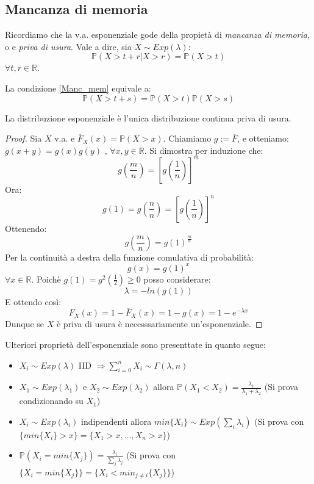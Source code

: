 \subsection{Mancanza di memoria}
Ricordiamo che la v.a. esponenziale gode della propietà di \textit{mancanza di memoria}, o e \textit{priva di usura}. Vale a dire, sia $X\sim Exp(\lambda)$:
\begin{equation} \label{Manc_mem}
\mathbb{P}(X>t+r|X>r)=\mathbb{P}(X>t)
\end{equation}
$\forall t,r\in\mathbb{R}$. 

La condizione \ref{Manc_mem} equivale a:
\[\mathbb{P}(X>t+s)=\mathbb{P}(X>t)\mathbb{P}(X>s)\]
\begin{proposition}
La distribuzione esponenziale è l'unica distribuzione continua priva di usura.
\begin{proof}
Sia $X$ v.a. e $\overline{F}_X(x)=\mathbb{P}(X>x)$. Chiamiamo $g:=\overline{F}$, e otteniamo: $g(x+y)=g(x)g(y)$ , $\forall x,y\in\mathbb{R}$.
Si dimostra per induzione che:
    \[g\left(\frac{m}{n}\right)=\left[g\left(\frac{1}{n}\right)\right]^m\]
Ora:
\[g(1)=g\left(\frac{n}{n}\right)=\left[g\left(\frac{1}{n}\right)\right]^n\]
Ottenendo: \label{Eq_dim_exp}
\[g\left(\frac{m}{n}\right)=g(1)^{\frac{m}{n}}\]
Per la continuità a destra della funzione comulativa di probabilità:  \[g(x)=g(1)^x\] $\forall x\in\mathbb{R}$.
Poichè $g(1)=g^2\left(\frac{1}{2}\right)\geq 0$ posso considerare:
\[\lambda=-ln(g(1))\]
E ottendo così:
\[F_X(x)=1-\overline{F}_X(x)=1-g(x)=1-e^{-\lambda x}\]
Dunque se $X$ è priva di usura è necesssariamente un'esponenziale. 
\end{proof}
\end{proposition}
 Ulteriori proprietà dell'esponenziale sono presenttate in quanto segue:
 \begin{itemize}
     \item $X_i\sim Exp(\lambda)$ IID $\Rightarrow \sum_{i=0}^nX_i\sim\Gamma(\lambda,n)$
     \item $X_1\sim Exp(\lambda_1)$ e $X_2\sim Exp(\lambda_2)$ allora $\mathbb{P}(X_1<X_2)=\frac{\lambda_1}{\lambda_1+\lambda_2}$ (Si prova condizionando su $X_1$)
     \item $X_i\sim Exp(\lambda_i)$ indipendenti allora $min\{X_i\}\sim Exp\left(\sum_i \lambda_i\right)$ (Si prova con $\{min\{X_i\}>x\}=\{X_1>x,\dots,X_n>x\}$)
     \item $\mathbb{P}(X_i=min\{X_j\})=\frac{\lambda_i}{\sum_j \lambda_j}$ (Si prova con $\{X_i=min\{X_j\}\}=\{X_i<min_{j\neq i}\{X_j\}\}$)
 \end{itemize}
